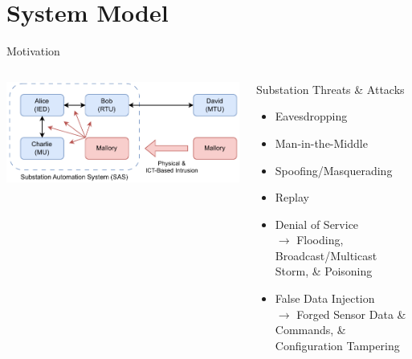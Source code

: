 \documentclass[en]{sdqbeamer}
\begin{document}
\section{System Model}
\begin{frame}{Motivation}
    \begin{columns}
        \centering
        \includegraphics[width=1.0\textwidth]{./figures/sas_intrusion.drawio.pdf}
        \begin{redblock}{Substation Threats \& Attacks}
            \begin{itemize}
                \item Eavesdropping
                \item Man-in-the-Middle
                \item Spoofing/Masquerading
                \item Replay
                \item Denial of Service\\$\rightarrow$ Flooding, Broadcast/Multicast Storm, \& Poisoning
                \item False Data Injection\\$\rightarrow$ Forged Sensor Data \& Commands, \& Configuration Tampering
            \end{itemize}
        \end{redblock}
    \end{columns}
\end{frame}
\end{document}

